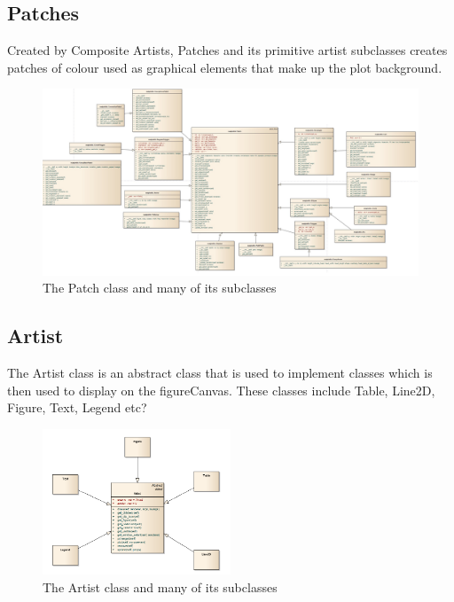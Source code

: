 \documentclass[pdftex,10pt,a4paper]{report}
\begin{document}
\subsection{Patches}
Created by Composite Artists, Patches and its primitive artist subclasses creates patches of colour used as graphical elements that make up the plot background.
\begin{figure}[ht!]
        \centering
                \includegraphics[width=\textwidth]{img/umls/derek/patch}
        \caption{The Patch class and many of its subclasses}\label{fig:artistExAgg}
\end{figure}

\subsection{Artist}

The Artist class is an abstract class that is used to implement classes which is then used to display on the figureCanvas. These classes include Table, Line2D, Figure, Text, Legend etc?

\begin{figure}[ht!]
        \centering
                \includegraphics[width=0.5\textwidth]{img/umls/dave/artist}
        \caption{The Artist class and many of its subclasses}
\end{figure}
\end{document}
